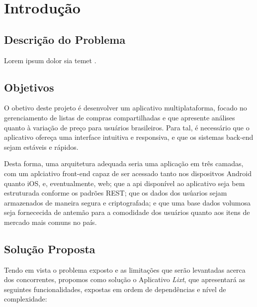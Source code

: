 \chapter{Introdução}

\section{Descrição do Problema}

Lorem ipsum dolor sia temet \cite[p. 3]{Kanan2015}.

\label{sec:objetivos}
\section{Objetivos}

O obetivo deste projeto é desenvolver um aplicativo multiplataforma,
focado no gerenciamento de listas de compras compartilhadas e que
apresente análises quanto à variação de preço para usuários
brasileiros. Para tal, é necessário que o aplicativo ofereça uma
interface intuitiva e responsiva, e que os sistemas back-end sejam
estáveis e rápidos.

Desta forma, uma arquitetura adequada seria uma aplicação em três
camadas, com um aplciativo front-end capaz de ser acessado tanto nos
dispositvos Android quanto iOS, e, eventualmente, web; que a api
disponível ao aplicativo seja bem estruturada conforme os padrões
REST; que os dados dos usúarios sejam armazenados de maneira segura e
criptografada; e que uma base dados volumosa seja fornececida de antemão para a
comodidade dos usuários quanto aos itens de mercado mais comuns no país.

\label{sec:solucao}
\section{Solução Proposta}

Tendo em vista o problema exposto e as limitações que serão levantadas
acerca dos concorrentes, propomos como solução o Aplicativo
\emph{Lixt}, que apresentará as seguintes funcionalidades, expostas em
ordem de dependências e nível de complexidade:

